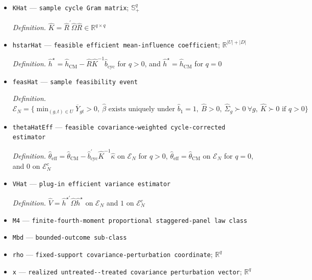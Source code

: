 \documentclass{article}
\begin{document}
\begin{itemize}
  \item \texttt{KHat} --- \texttt{sample cycle Gram matrix}; \(\mathbb S_+^q\)
  \par\smallskip\noindent\emph{Definition.} \(\widehat K=\widehat R^{\prime}\widehat\Omega\widehat R\in\mathbb R^{q\times q}\)
  \item \texttt{hstarHat} --- \texttt{feasible efficient mean-\allowbreak{}influence coefficient}; \(\mathbb R^{|U|+|D|}\)
  \par\smallskip\noindent\emph{Definition.} \(\widehat h^{\star}=\widehat h_{\mathrm{CM}}-\widehat R\widehat K^{-1}\widehat b_{\mathrm{cyc}}\) for \(q>0\), and \(\widehat h^{\star}=\widehat h_{\mathrm{CM}}\) for \(q=0\)
  \item \texttt{feasHat} --- \texttt{sample feasibility event}
  \par\smallskip\noindent\emph{Definition.} \(\mathcal E_N=\{\min_{(g,t)\in U}\overline Y_{gt}>0,\ \widehat\beta\text{ exists uniquely under }\widehat b_1=1,\ \widehat B>0,\ \widehat\Sigma_g\succ0\ \forall g,\ \widehat K\succ0\text{ if }q>0\}\)
  \item \texttt{thetaHatEff} --- \texttt{feasible covariance-\allowbreak{}weighted cycle-\allowbreak{}corrected estimator}
  \par\smallskip\noindent\emph{Definition.} \(\widehat\theta_{\mathrm{eff}}=\widehat\theta_{\mathrm{CM}}-\widehat b_{\mathrm{cyc}}^{\prime}\widehat K^{-1}\widehat\kappa\) on \(\mathcal E_N\) for \(q>0\), \(\widehat\theta_{\mathrm{eff}}=\widehat\theta_{\mathrm{CM}}\) on \(\mathcal E_N\) for \(q=0\), and \(0\) on \(\mathcal E_N^c\)
  \item \texttt{VHat} --- \texttt{plug-\allowbreak{}in efficient variance estimator}
  \par\smallskip\noindent\emph{Definition.} \(\widehat V=\widehat h^{\star\prime}\widehat\Omega\widehat h^{\star}\) on \(\mathcal E_N\) and \(1\) on \(\mathcal E_N^c\)
  \item \texttt{M4} --- \texttt{finite-\allowbreak{}fourth-\allowbreak{}moment proportional staggered-\allowbreak{}panel law class}
  \item \texttt{Mbd} --- \texttt{bounded-\allowbreak{}outcome sub-\allowbreak{}class}
  \item \texttt{rho} --- \texttt{fixed-\allowbreak{}support covariance-\allowbreak{}perturbation coordinate}; \(\mathbb R^q\)
  \item \texttt{x} --- \texttt{realized untreated-\allowbreak{}-\allowbreak{}treated covariance perturbation vector}; \(\mathbb R^q\)

\end{itemize}
\end{document}
